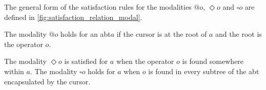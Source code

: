 \documentclass[sigplan,review]{acmart}
\newcommand{\abt}{\textsf{abt}\xspace}
\begin{document}

The general form of the satisfaction rules for the modalities $@o$,
$\Diamond o$ and $\square o$ are defined in
\cref{fig:satisfaction_relation_modal}.

The modality $@o$ holds for an \abt $a$ if the cursor is at the root of
$a$ and the root is the operator $o$.

The modality $\Diamond o$ is satisfied for $a$ when the operator $o$ is
found somewhere within $a$. The modality
$\square o$ holds for $a$ when $o$ is found in every subtree of the
\abt encapsulated by the cursor. 
\end{document}

